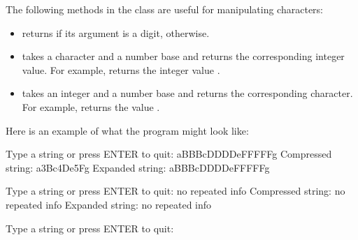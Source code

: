\begin{exercise}




The following methods in the  class are useful for manipulating characters:
\begin{itemize}
\item {} returns  if its  argument is a digit,  otherwise.
\item {} takes a character and a number base and returns the corresponding integer value. For example,  returns the integer value .
\item {} takes an integer and a number base and returns the corresponding character. For example,  returns the  value .
\end{itemize}

Here is an example of what the program might look like:

\begin{stdout}
Type a string or press ENTER to quit: aBBBcDDDDeFFFFFg
Compressed string: a3Bc4De5Fg
Expanded string: aBBBcDDDDeFFFFFg

Type a string or press ENTER to quit: no repeated info
Compressed string: no repeated info
Expanded string: no repeated info

Type a string or press ENTER to quit: 
\end{stdout}
\end{exercise}
